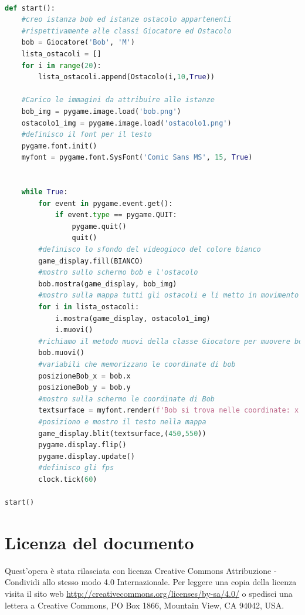 \documentclass[12pt,a4paper]{article}
\begin{document}
\begin{lstlisting}[language=Python, caption=Codice videogioco "Il mondo di Bob" della seconda lezione]
    
def start():
    #creo istanza bob ed istanze ostacolo appartenenti
    #rispettivamente alle classi Giocatore ed Ostacolo
    bob = Giocatore('Bob', 'M')
    lista_ostacoli = []
    for i in range(20):
        lista_ostacoli.append(Ostacolo(i,10,True))

    #Carico le immagini da attribuire alle istanze
    bob_img = pygame.image.load('bob.png')
    ostacolo1_img = pygame.image.load('ostacolo1.png')
    #definisco il font per il testo 
    pygame.font.init() 
    myfont = pygame.font.SysFont('Comic Sans MS', 15, True)
    

    while True:
        for event in pygame.event.get():
            if event.type == pygame.QUIT:
                pygame.quit()
                quit()
        #definisco lo sfondo del videogioco del colore bianco
        game_display.fill(BIANCO) 
        #mostro sullo schermo bob e l'ostacolo
        bob.mostra(game_display, bob_img)
        #mostro sulla mappa tutti gli ostacoli e li metto in movimento
        for i in lista_ostacoli:
            i.mostra(game_display, ostacolo1_img)
            i.muovi()
        #richiamo il metodo muovi della classe Giocatore per muovere bob
        bob.muovi()
        #variabili che memorizzano le coordinate di bob
        posizioneBob_x = bob.x
        posizioneBob_y = bob.y
        #mostro sulla schermo le coordinate di Bob
        textsurface = myfont.render(f'Bob si trova nelle coordinate: x: {str(posizioneBob_x)} y: {str(posizioneBob_y)}',False, (0, 0, 0))
        #posiziono e mostro il testo nella mappa
        game_display.blit(textsurface,(450,550))
        pygame.display.flip()
        pygame.display.update()
        #definisco gli fps
        clock.tick(60)
        
start()

\end{lstlisting}






\newpage

\section{Licenza del documento}\label{licenza}

Quest'opera è stata rilasciata con licenza Creative Commons Attribuzione - Condividi allo stesso modo 4.0 Internazionale. Per leggere una copia della licenza visita il sito web \url{http://creativecommons.org/licenses/by-sa/4.0/} o spedisci una lettera a Creative Commons, PO Box 1866, Mountain View, CA 94042, USA.
\end{document}
